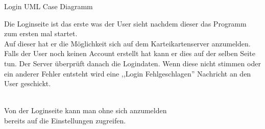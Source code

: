 \large{Login UML Case Diagramm}

\newcommand{\servername}{KarteikartenAG Server}
\newcommand{\clientname}{User}
\newcommand{\systemname}{KarteikartenAG Client}

\begin{center}
\end{center}

\begin{answer}
    Die Loginseite ist das erste was der User sieht nachdem dieser das Programm zum ersten mal startet. \\
    Auf dieser hat er die Möglichkeit sich auf dem Karteikartenserver anzumelden. Falls der User noch keinen Account erstellt hat kann er dies auf der selben Seite tun. Der Server überprüft danach die Logindaten. Wenn diese nicht stimmen oder ein anderer Fehler entsteht wird eine ,,Login Fehlgeschlagen'' Nachricht an den User geschickt.

    
     \\
    \noindent
    Von der Loginseite kann man ohne sich anzumelden \\ 
    bereits auf die Einstellungen zugreifen.

\end{answer}